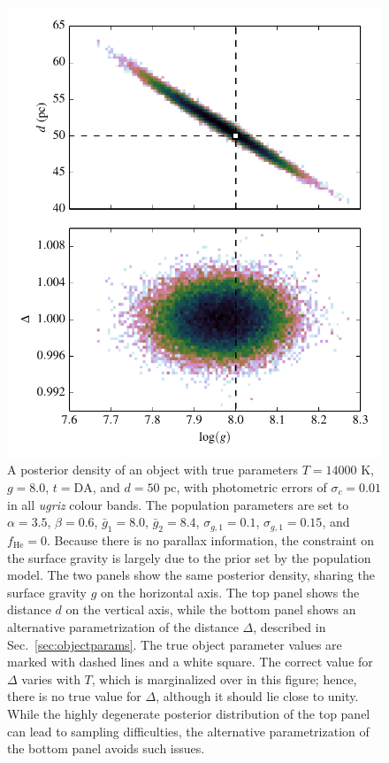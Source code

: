 \documentclass[fleqn,usenatbib]{mnras}
\newcommand{\Teff}{T}
\newcommand{\logg}{g}
\begin{document}
\begin{figure}
	\includegraphics[width=\columnwidth]{banana.pdf}
    \caption{A posterior density of an object with true parameters $\Teff=14000$ K, $\logg=8.0$, $t=\text{DA}$, and $d=50$ pc, with photometric errors of $\sigma_c=0.01$ in all \emph{ugriz} colour bands. The population parameters are set to $\alpha=3.5$, $\beta=0.6$, $\bar{g}_1=8.0$, $\bar{g}_2=8.4$, $\sigma_{g,1}=0.1$, $\sigma_{g,1}=0.15$, and $f_\text{He}=0$. Because there is no parallax information, the constraint on the surface gravity is largely due to the prior set by the population model. The two panels show the same posterior density, sharing the surface gravity $\logg$ on the horizontal axis. The top panel shows the distance $d$ on the vertical axis, while the bottom panel shows an alternative parametrization of the distance $\Delta$, described in Sec.~\ref{sec:objectparams}. The true object parameter values are marked with dashed lines and a white square. The correct value for $\Delta$ varies with $\Teff$, which is marginalized over in this figure; hence, there is no true value for $\Delta$, although it should lie close to unity. While the highly degenerate posterior distribution of the top panel can lead to sampling difficulties, the alternative parametrization of the bottom panel avoids such issues.}
    \label{fig:banana}
\end{figure}
\end{document}
